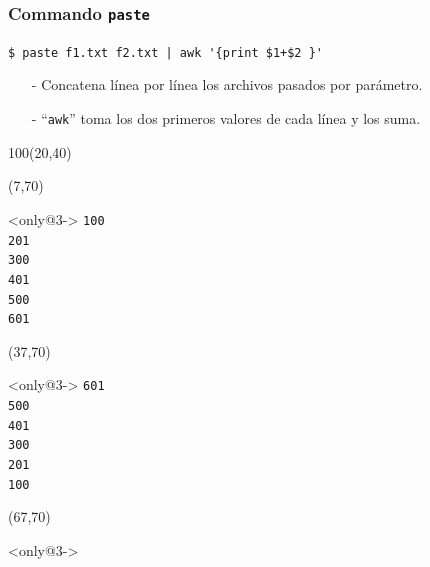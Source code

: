 \documentclass{beamer}
\begin{document}
\begin{frame}[fragile,t]
    \frametitle{Commando \texttt{paste}}
    \begin{block}{\vspace*{-3ex}}
    \texttt{\$}\verb: paste f1.txt f2.txt | awk '{print $1+$2 }':
    \vspace*{0.5ex}
    \end{block}
    \begin{itemize}
    \item[-] Concatena línea por línea los archivos pasados por parámetro.
    \item[-] ``\verb|awk|'' toma los dos primeros valores de cada línea y los suma.
    \end{itemize}
    \begin{textblock}{100}(20,40)
    \begin{center}
    \end{center}
    \end{textblock}
    \begin{textblock}{20}(7,70)
    \begin{block}<only@3->{\vspace*{-3ex}}
    \scriptsize
    \verb:100:\\
    \verb:201:\\
    \verb:300:\\
    \verb:401:\\
    \verb:500:\\
    \verb:601:
    \vspace*{0.5ex}
    \end{block}
    \end{textblock}
    \begin{textblock}{20}(37,70)
    \begin{block}<only@3->{\vspace*{-3ex}}
    \scriptsize
    \verb:601:\\
    \verb:500:\\
    \verb:401:\\
    \verb:300:\\
    \verb:201:\\
    \verb:100:
    \vspace*{0.5ex}
    \end{block}
    \end{textblock}
    \begin{textblock}{20}(67,70)
    \begin{block}<only@3->{\vspace*{-3ex}}

\end{block}
\end{textblock}
\end{frame}
\end{document}

